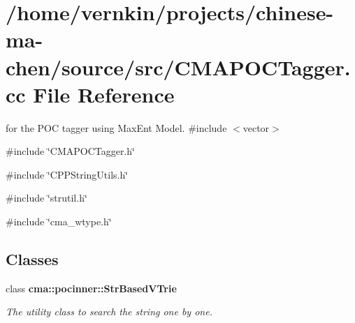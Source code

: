 \section{/home/vernkin/projects/chinese-\/ma-\/chen/source/src/CMAPOCTagger.cc File Reference}
\label{CMAPOCTagger_8cc}


for the POC tagger using MaxEnt Model.  
{\ttfamily \#include $<$vector$>$}\par
{\ttfamily \#include \char`\"{}CMAPOCTagger.h\char`\"{}}\par
{\ttfamily \#include \char`\"{}CPPStringUtils.h\char`\"{}}\par
{\ttfamily \#include \char`\"{}strutil.h\char`\"{}}\par
{\ttfamily \#include \char`\"{}cma\_\-wtype.h\char`\"{}}\par
\subsection*{Classes}
\begin{DoxyCompactItemize}
\item 
class {\bf cma::pocinner::StrBasedVTrie}
\begin{DoxyCompactList}\small\item\em The utility class to search the string one by one. \item\end{DoxyCompactList}\end{DoxyCompactItemize}

